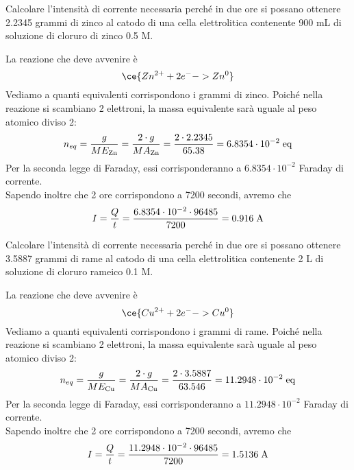 \begin{esercizio}
    Calcolare l'intensità di corrente necessaria perché in due ore si possano ottenere 2.2345 grammi di zinco al catodo di una cella elettrolitica contenente 900 mL di soluzione di cloruro di zinco 0.5 M.
\end{esercizio}
\begin{soluzione}
    La reazione che deve avvenire è
    \begin{equation*}
        \ce{Zn^{2+} + 2e^- -> Zn^{0}}
    \end{equation*}
    Vediamo a quanti equivalenti corrispondono i grammi di zinco. Poiché nella reazione si scambiano 2 elettroni, la massa equivalente sarà uguale al peso atomico diviso 2:
    \begin{equation*}
        n_{eq}=\frac{g}{ME_{\rm Zn}}=\frac{2 \cdot g}{MA_{\rm Zn}}
        =\frac{2 \cdot 2.2345}{65.38}
        =6.8354 \cdot 10^{-2} \; \rm eq
    \end{equation*}
    Per la seconda legge di Faraday, essi corrisponderanno a $6.8354 \cdot 10^{-2}$ Faraday di corrente.\\
    Sapendo inoltre che 2 ore corrispondono a 7200 secondi, avremo che
    \begin{equation*}
        I=\frac{Q}{t}
        =\frac{6.8354 \cdot 10^{-2} \cdot 96485}{7200}=0.916 \; \rm A
    \end{equation*}
\end{soluzione}

\newpage

\begin{esercizio}
    Calcolare l'intensità di corrente necessaria perché in due ore si possano ottenere 3.5887 grammi di rame al catodo di una cella elettrolitica contenente 2 L di soluzione di cloruro rameico 0.1 M.
\end{esercizio}
\begin{soluzione}
    La reazione che deve avvenire è
    \begin{equation*}
        \ce{Cu^{2+} + 2e^- -> Cu^{0}}
    \end{equation*}
    Vediamo a quanti equivalenti corrispondono i grammi di rame. Poiché nella reazione si scambiano 2 elettroni, la massa equivalente sarà uguale al peso atomico diviso 2:
    \begin{equation*}
        n_{eq}
        =\frac{g}{ME_{\rm Cu}}
        =\frac{2 \cdot g}{MA_{\rm Cu}}
        =\frac{2 \cdot 3.5887}{63.546}
        =11.2948 \cdot 10^{-2} \; \rm eq
    \end{equation*}
    Per la seconda legge di Faraday, essi corrisponderanno a $11.2948 \cdot 10^{-2}$ Faraday di corrente.\\
    Sapendo inoltre che 2 ore corrispondono a 7200 secondi, avremo che
    \begin{equation*}
        I=\frac{Q}{t}
        =\frac{11.2948 \cdot 10^{-2} \cdot 96485}{7200}
        =1.5136 \; \rm A
    \end{equation*}
\end{soluzione}

